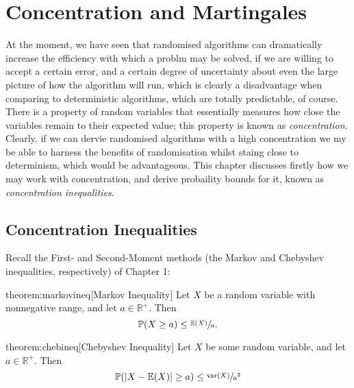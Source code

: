 \chapter{Concentration and Martingales}
	
	At the moment, we have seen that randomised algorithms can dramatically increase the 
	efficiency with which a problm may be solved, if we are willing to accept a certain error, 
	and a certain degree of uncertainty about even the large picture of how the algorithm will 
	run, which is clearly a disadvantage when comparing to deterministic algorithms, which are 
	totally predictable, of course. 
	\\
	There is a property of random variables that essentially measures how close the variables 
	remain to their expected value; this property is known as \emph{concentration}. Clearly, 
	if we can dervie randomised algorithms with a high concentration we my be able to harness 
	the benefits of randomisation whilst staing close to determinism, which would be 
	advantageous. This chapter discusses firstly how we may work with concentration, and 
	derive probaility bounds for it, known as \emph{concentration inequalities}.
	\section{Concentration Inequalities}
	Recall the First- and Second-Moment methods (the Markov and Chebyshev inequalities, 
	respectively) of Chapter 1:
	\begin{reptheorem}{theorem:markovineq}[Markov Inequality]
		Let $X$ be a random variable with nonnegative range, and let $a \in \mathbb{R}^+$.
		Then 
		$$
			\mathbb{P}(X \geq a) \leq \sfrac{\mathbb{E}(X)}{a}.
		$$
	\end{reptheorem}
	\begin{reptheorem}{theorem:chebineq}[Chebyshev Inequality]
		Let $X$ be some random variable, and let $a\in \mathbb{R}^+$. Then
		$$
			\mathbb{P}(|X-\mathbb{E}(X)| \geq a) \leq \sfrac{\mathrm{var}(X)}{a^2} 
		$$
	\end{reptheorem}
	\begin{comment}
		From the Markov inequality, we can obtain the two following results, too, where 
		$f \in \mathbb{R}\rightarrow 0,\infty)$:
		\begin{enumerate}[(1)]
			\item
			If $f$ is an increasing function, then 
			$$
			\mathbb{P}(X \geq a) \leq \mathbb{P}(f(X) \geq f(a)) \leq 
			\sfrac{\mathbb{E}(f(X))}{f(a)}.
			$$
			\item
			If $f$ is a decreasing function, then 
			$$
			\mathbb{P}(X \leq a) \leq \mathbb{P}(f(X) \geq f(a)) \leq 
			\sfrac{\mathbb{E}(f(X))}{f(a)}.
			$$
		\end{enumerate}
		We will soon see that using these, and choosing appropriate functions, we may 
		obtain significantly tighter concentration inequalities than the classical Markov 
		and Chebyshev bounds, in the sense explained by the following example.
	\end{comment}

